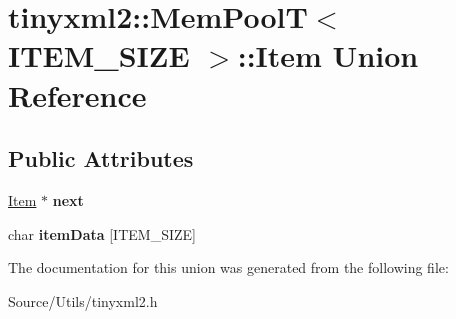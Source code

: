 \hypertarget{uniontinyxml2_1_1_mem_pool_t_1_1_item}{}\section{tinyxml2\+:\+:Mem\+PoolT$<$ I\+T\+E\+M\+\_\+\+S\+I\+ZE $>$\+:\+:Item Union Reference}
\label{uniontinyxml2_1_1_mem_pool_t_1_1_item}
\subsection*{Public Attributes}
\begin{DoxyCompactItemize}
\item 
\mbox{\label{uniontinyxml2_1_1_mem_pool_t_1_1_item_a5620107f518c60d6619e8662d4c9d643}} 
\mbox{\hyperlink{uniontinyxml2_1_1_mem_pool_t_1_1_item}{Item}} $\ast$ {\bfseries next}
\item 
\mbox{\label{uniontinyxml2_1_1_mem_pool_t_1_1_item_aff63ccc8d7b05035820b83e1f0fa8037}} 
char {\bfseries item\+Data} \mbox{[}I\+T\+E\+M\+\_\+\+S\+I\+ZE\mbox{]}
\end{DoxyCompactItemize}


The documentation for this union was generated from the following file\+:\begin{DoxyCompactItemize}
\item 
Source/\+Utils/tinyxml2.\+h\end{DoxyCompactItemize}
